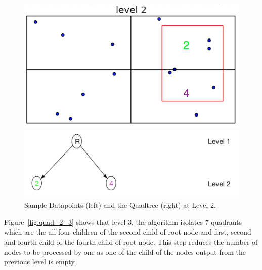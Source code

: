 \begin{figure}[H]
  \centering
  \vspace{0.5in}
  \begin{minipage}[b]{0.35\textwidth}
    \includegraphics[width=\textwidth]{Images/2Quad_2}
  \end{minipage}
  \hfill
  \begin{minipage}[b]{0.6\textwidth}
    \includegraphics[width=\textwidth]{Images/2Quad_2_tree}
  \end{minipage}
  \vspace{0.5in}
  \caption{Sample Datapoints (left) and the Quadtree (right) at Level 2.}
   \label{fig:quad_2_2}
\end{figure}

Figure~\ref{fig:quad_2_3} shows that level 3, the algorithm isolates 7 quadrants which are the all four children of the second child of root node and first, second and fourth child of the fourth child of root node.
This step reduces the number of nodes to be processed by one as one of the child of the nodes output from the previous level is empty.

